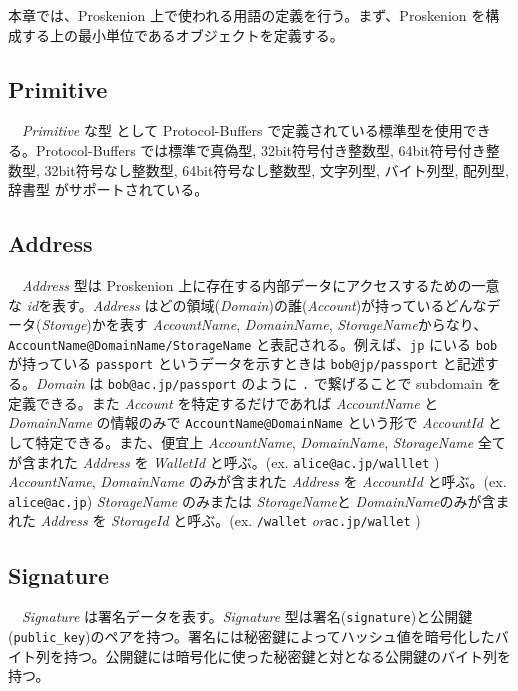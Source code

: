 本章では、Proskenion 上で使われる用語の定義を行う。まず、Proskenion
を構成する上の最小単位であるオブジェクトを定義する。

\hypertarget{primitive}{%
\subsection{Primitive}\label{primitive}}

　\emph{Primitive} な型 として Protocol-Buffers
で定義されている標準型を使用できる。Protocol-Buffers では標準で真偽型,
32bit符号付き整数型, 64bit符号付き整数型, 32bit符号なし整数型,
64bit符号なし整数型, 文字列型, バイト列型, 配列型, 辞書型
がサポートされている。

\hypertarget{address}{%
\subsection{Address}\label{address}}

　\emph{Address} 型は Proskenion
上に存在する内部データにアクセスするための一意な
\emph{id}を表す。\emph{Address}
はどの領域(\emph{Domain})の誰(\emph{Account})が持っているどんなデータ(\emph{Storage})かを表す
\emph{AccountName}, \emph{DomainName}, \emph{StorageName}からなり、
\texttt{AccountName@DomainName/StorageName}
と表記される。例えば、\texttt{jp} にいる \texttt{bob} が持っている
\texttt{passport} というデータを示すときは \texttt{bob@jp/passport}
と記述する。\emph{Domain} は \texttt{bob@ac.jp/passport} のように
\texttt{.} で繋げることで subdomain を定義できる。また \emph{Account}
を特定するだけであれば \emph{AccountName} と \emph{DomainName}
の情報のみで \texttt{AccountName@DomainName} という形で \emph{AccountId}
として特定できる。また、便宜上 \emph{AccountName}, \emph{DomainName},
\emph{StorageName} 全てが含まれた \emph{Address} を \emph{WalletId}
と呼ぶ。(ex. \texttt{alice@ac.jp/walllet} ) \emph{AccountName},
\emph{DomainName} のみが含まれた \emph{Address} を \emph{AccountId}
と呼ぶ。(ex. \texttt{alice@ac.jp}) \emph{StorageName} のみまたは
\emph{StorageName}と \emph{DomainName}のみが含まれた \emph{Address} を
\emph{StorageId} と呼ぶ。(ex. \texttt{/wallet}
\emph{or}\texttt{ac.jp/wallet} )

\hypertarget{signature}{%
\subsection{Signature}\label{signature}}

　\emph{Signature} は署名データを表す。\emph{Signature}
型は署名(\texttt{signature})と公開鍵(\texttt{public\_key})のペアを持つ。署名には秘密鍵によってハッシュ値を暗号化したバイト列を持つ。公開鍵には暗号化に使った秘密鍵と対となる公開鍵のバイト列を持つ。

